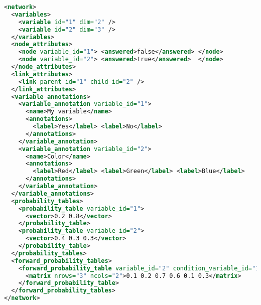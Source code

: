 
\label{sec:source_code}

\begin{lstlisting}[language=XML, 
label=lst:arch_and_mod:net_persistence:bnxml]
<network>                                                                                                             
  <variables> 
    <variable id="1" dim="2" />
    <variable id="2" dim="3" />
  </variables>
  <node_attributes>
    <node variable_id="1"> <answered>false</answered> </node>
    <node variable_id="2"> <answered>true</answered>  </node>
  </node_attributes> 
  <link_attributes>
    <link parent_id="1" child_id="2" />
  </link_attributes>
  <variable_annotations>
    <variable_annotation variable_id="1">
      <name>My variable</name>
      <annotations>
        <label>Yes</label> <label>No</label>
      </annotations>
    </variable_annotation>
    <variable_annotation variable_id="2">
      <name>Color</name>
      <annotations>
        <label>Red</label> <label>Green</label> <label>Blue</label>
      </annotations>
    </variable_annotation>
  </variable_annotations>
  <probability_tables>
    <probability_table variable_id="1">
      <vector>0.2 0.8</vector>
    </probability_table>
    <probability_table variable_id="2">
      <vector>0.4 0.3 0.3</vector>
    </probability_table>
  </probability_tables>
  <forward_probability_tables>
    <forward_probability_table variable_id="2" condition_variable_id="1">
      <matrix nrows="3" ncols="2">0.1 0.2 0.7 0.6 0.1 0.3</matrix>
    </forward_probability_table>
  </forward_probability_tables>
</network>
\end{lstlisting}

